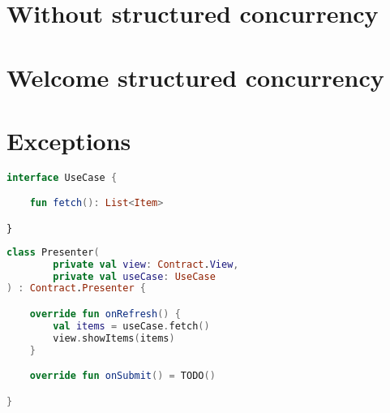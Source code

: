 \documentclass[10pt]{beamer}
\begin{document}
\section{Without structured concurrency}




\section{Welcome structured concurrency}


\section{Exceptions}




\begin{frame}[fragile]
\begin{lstlisting}[language=Kotlin, basicstyle=\ttfamily]
interface UseCase {

    fun fetch(): List<Item>

}
\end{lstlisting}
\end{frame}



\begin{frame}[fragile]
\begin{lstlisting}[language=Kotlin, basicstyle=\ttfamily]
class Presenter(
        private val view: Contract.View,
        private val useCase: UseCase
) : Contract.Presenter {

    override fun onRefresh() {
        val items = useCase.fetch()
        view.showItems(items)
    }

    override fun onSubmit() = TODO()

}
\end{lstlisting}
\end{frame}



\begin{frame}[fragile]
\begin{lstlisting}[language=Kotlin, basicstyle=\ttfamily]
\end{lstlisting}
\end{frame}


\begin{frame}[fragile]
\begin{lstlisting}[language=Kotlin, basicstyle=\ttfamily]
\end{lstlisting}
\end{frame}
\end{document}
